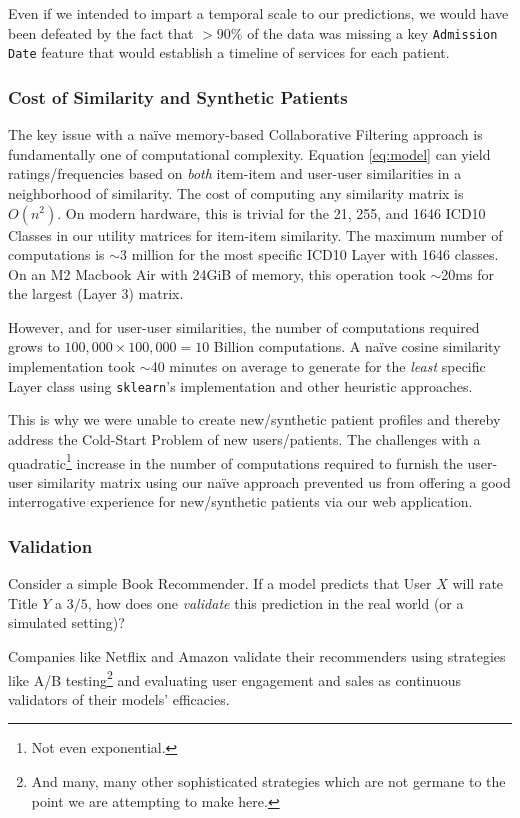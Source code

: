 \documentclass[twoside,11pt]{article}
\begin{document}
{Even if we intended to impart a temporal scale to our predictions, we would have been defeated by the fact that $>90\%$ of the data was missing a key \texttt{Admission Date} feature that would establish a timeline of services for each patient.

\subsubsection*{Cost of Similarity and Synthetic Patients}

The key issue with a na{\"i}ve memory-based Collaborative Filtering approach is fundamentally one of computational complexity. Equation \ref{eq:model} can yield ratings/frequencies based on \textit{both} item-item and user-user similarities in a neighborhood of similarity. The cost of computing any similarity matrix is $O(n^2)$. On modern hardware, this is trivial for the 21, 255, and 1646 ICD10 Classes in our utility matrices for item-item similarity. The maximum number of computations is $\sim$3 million for the most specific ICD10 Layer with 1646 classes. On an M2 Macbook Air with 24GiB of memory, this operation took $\sim$20ms for the largest (Layer 3) matrix.

However, and for user-user similarities, the number of computations required grows to $100,000 \times 100,000 = 10$ Billion computations. A na{\"i}ve cosine similarity implementation took $\sim$40 minutes on average to generate for the \textit{least} specific Layer class using \texttt{sklearn}'s implementation and other heuristic approaches.

This is why we were unable to create new/synthetic patient profiles and thereby address the Cold-Start Problem of new users/patients. The challenges with a quadratic\footnote{Not even exponential.} increase in the number of computations required to furnish the user-user similarity matrix using our na{\"i}ve approach prevented us from offering a good interrogative experience for new/synthetic patients via our web application.

\subsubsection*{Validation}

Consider a simple Book Recommender. If a model predicts that User $X$ will rate Title $Y$ a $3/5$, how does one \textit{validate} this prediction in the real world (or a simulated setting)?

Companies like Netflix and Amazon validate their recommenders using strategies like A/B testing\footnote{And many, many other sophisticated strategies which are not germane to the point we are attempting to make here.} and evaluating user engagement and sales as continuous validators of their models' efficacies.

}
\end{document}
